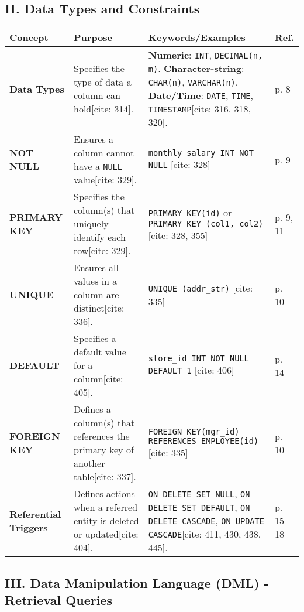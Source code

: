 \documentclass[12pt,a4paper]{article}
\begin{document}
\subsection*{II. Data Types and Constraints}

\begin{longtable}{>{\bfseries}p{} p{} p{} p{}}
\toprule
\textbf{Concept} & \textbf{Purpose} & \textbf{Keywords/Examples} & \textbf{Ref.} \\
\midrule
\endhead
\textbf{Data Types} & Specifies the type of data a column can hold[cite: 314]. & \textbf{Numeric}: \texttt{INT}, \texttt{DECIMAL(n, m)}. \textbf{Character-string}: \texttt{CHAR(n)}, \texttt{VARCHAR(n)}. \textbf{Date/Time}: \texttt{DATE}, \texttt{TIME}, \texttt{TIMESTAMP}[cite: 316, 318, 320]. & p. 8 \\
\textbf{NOT NULL} & Ensures a column cannot have a \texttt{NULL} value[cite: 329]. & \texttt{monthly\_salary INT NOT NULL} [cite: 328] & p. 9 \\
\textbf{PRIMARY KEY} & Specifies the column(s) that uniquely identify each row[cite: 329]. & \texttt{PRIMARY KEY(id)} or \texttt{PRIMARY KEY (col1, col2)} [cite: 328, 355] & p. 9, 11 \\
\textbf{UNIQUE} & Ensures all values in a column are distinct[cite: 336]. & \texttt{UNIQUE (addr\_str)} [cite: 335] & p. 10 \\
\textbf{DEFAULT} & Specifies a default value for a column[cite: 405]. & \texttt{store\_id INT NOT NULL DEFAULT 1} [cite: 406] & p. 14 \\
\textbf{FOREIGN KEY} & Defines a column(s) that references the primary key of another table[cite: 337]. & \texttt{FOREIGN KEY(mgr\_id) REFERENCES EMPLOYEE(id)} [cite: 335] & p. 10 \\
\textbf{Referential Triggers} & Defines actions when a referred entity is deleted or updated[cite: 404]. & \texttt{ON DELETE SET NULL}, \texttt{ON DELETE SET DEFAULT}, \texttt{ON DELETE CASCADE}, \texttt{ON UPDATE CASCADE}[cite: 411, 430, 438, 445]. & p. 15-18 \\
\bottomrule
\end{longtable}

\vspace{0.5cm}

\subsection*{III. Data Manipulation Language (DML) - Retrieval Queries}
\end{document}
